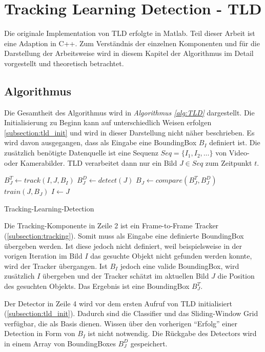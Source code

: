 \section{Tracking Learning Detection - TLD}
	Die originale Implementation von TLD erfolgte in Matlab. Teil dieser Arbeit ist eine Adaption in C++. Zum Verständnis der einzelnen Komponenten und für die Darstellung der Arbeitsweise wird in diesem Kapitel der Algorithmus im Detail vorgestellt und theoretisch betrachtet.

	\subsection{Algorithmus}
	Die Gesamtheit des Algorithmus wird in {\em Algorithmus \ref{alg:TLD}} dargestellt. Die Initialisierung zu Beginn kann auf unterschiedlich Weisen erfolgen \ref{subsection:tld_init} und wird in dieser Darstellung nicht näher beschrieben. Es wird davon ausgegangen, dass als Eingabe eine BoundingBox $B_I$ definiert ist. Die zusätzlich benötigte Datenquelle ist eine Sequenz $Seq = \{I_1, I_2, \dots \}$ von Video- oder Kamerabilder. TLD verarbeitet dann nur ein Bild $J \in Seq$ zum Zeitpunkt $t$.

	\begin{algorithm}[H]
		\vspace{0.2cm}
		 {
			$B_J^T \leftarrow track(I,J,B_I)$\;
		}
		$B_J^D \leftarrow detect(J)$\;
		$B_J \leftarrow compare(B_J^T,B_J^D)$\;
		 { 
			$train(J,B_J)$\;
		}
		$I \leftarrow J$\;		
		\caption{Tracking-Learning-Detection}
		\label{alg:TLD}
		\vspace{0.2cm}
	\end{algorithm}
	Die Tracking-Komponente in Zeile 2 ist ein Frame-to-Frame Tracker (\ref{subsection:tracking}). Somit muss als Eingabe eine definierte BoundingBox übergeben werden. Ist diese jedoch nicht definiert, weil beispielsweise in der vorigen Iteration im Bild $I$ das gesuchte Objekt nicht gefunden werden konnte, wird der Tracker übergangen. Ist $B_I$ jedoch eine valide BoundingBox, wird zusätzlich $I$ übergeben und der Tracker schätzt im aktuellen Bild $J$ die Position des gesuchten Objekts. Das Ergebnis ist eine BoundingBox $B_J^T$. 
	
	Der Detector in Zeile 4 wird vor dem ersten Aufruf von TLD initialisiert (\ref{subsection:tld_init}). Dadurch sind die Classifier und das Sliding-Window Grid verfügbar, die als Basis dienen. Wissen über den vorherigen ``Erfolg'' einer Detection in Form von $B_I$ ist nicht notwendig. Die Rückgabe des Detectors wird in einem Array von BoundingBoxes $B_J^D$ gespeichert.

